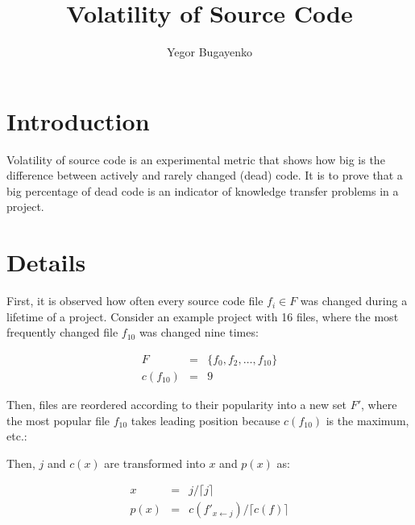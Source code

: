 \documentclass[12pt]{article}
\begin{document}
    \setlength{\parindent}{0pt}
    \setlength{\parskip}{1em}

\title{Volatility of Source Code}
\author{Yegor Bugayenko}
\maketitle

\section{Introduction}

    Volatility of source code is an experimental metric that
    shows how big is the difference between actively and rarely changed (dead)
    code. It is to prove that a big percentage of dead code is
    an indicator of knowledge transfer problems in a project.

\section{Details}

    First, it is observed how often every source code file $f_i \in F$ was changed
    during a lifetime of a project. Consider an example project with 16 files,
    where the most frequently changed file $f_{10}$ was changed nine times:

    \begin{eqnarray}
    F &=&  \{f_0, f_2, \dots, f_{10}\} \\
    c(f_{10}) &=& 9
    \end{eqnarray}

    \begin{figure}[ht]
    \centering
    \immediate{}
    
    \end{figure}

    Then, files are reordered according to their popularity into a new set $F'$,
    where the most popular file $f_{10}$ takes leading position because $c(f_{10})$ is
    the maximum, etc.:

    \begin{figure}[ht]
    \centering
    \immediate{}
    
    \end{figure}

    Then, $j$ and $c(x)$ are transformed into $x$ and $p(x)$ as:

    \begin{eqnarray}
    x &=& j / \lceil j \rceil \\
    p(x) &=& c(f'_{x \gets j}) / \lceil c(f) \rceil
    \end{eqnarray}
\end{document}
